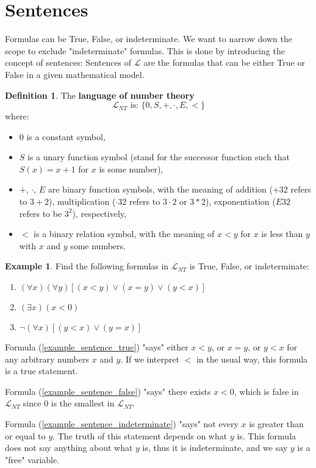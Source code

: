 \documentclass[11pt,letterpaper]{book}
\theoremstyle{definition}
\newtheorem{definition}{Definition}[section]
\newtheorem{example}{Example}[section]
\begin{document}
\section{Sentences}


Formulas can be True, False, or indeterminate. We want to narrow down
the scope to exclude "indeterminate" formulas. This is done by
introducing the concept of sentences: Sentences of $\mathcal{L}$ are the
formulas that can be either True or False in a given mathematical model.


\begin{definition}\label{def:language_nt}
The \textbf{language of number theory}
$$\mathcal{L}_{NT} \mbox{ is: } \{ 0, S, +, \cdot, E, <  \}$$
where:
\begin{itemize}
\item{$0$ is a constant symbol,}
\item{$S$ is a unary function symbol (stand for the successor function
such that $S(x) = x+1$ for $x$ is some number),}
\item{$+$, $\cdot$, $E$ are binary function symbols, with the meaning of
addition ($+32$ refers to $3+2$), multiplication ($\cdot 32$ refers to
$3 \cdot 2$ or $3 * 2$), exponentiation ($E32$ refers to be $3^2$),
respectively, }
\item{$<$ is a binary relation symbol, with the meaning of $x < y$ for
$x$ is less than $y$ with $x$ and $y$ some numbers.}
\end{itemize}

\end{definition}

\begin{example}\label{example_sentence}
Find the following formulas in $\mathcal{L}_{NT}$ is True, False, or
indeterminate:
\begin{enumerate}
\item{$ (\forall x)(\forall y) [ (x<y) \lor (x=y) \lor (y<x) ]
$}\label{example_sentence_true}
\item{$(\exists x) (x < 0) $}\label{example_sentence_false}
\item{$ \lnot (\forall x) [ (y < x) \lor (y = x) ]
$}\label{example_sentence_indeterminate}

\end{enumerate}

Formula (\ref{example_sentence_true}) "says" either $x<y$, or $x=y$, or
$y<x$ for any arbitrary numbers $x$ and $y$. If we interpret $<$ in the
usual way, this formula is a true statement.

Formula (\ref{example_sentence_false}) "says" there exists $x<0$, which
is false in $\mathcal{L}_{NT}$ since $0$ is the smallest in
$\mathcal{L}_{NT}$.

Formula (\ref{example_sentence_indeterminate}) "says" not every $x$ is
greater than or equal to $y$. The truth of this statement depends on
what $y$ is. This formula does not say anything about what $y$ is, thus
it is indeterminate, and we say $y$ is a "free" variable.

\end{example}
\end{document}
